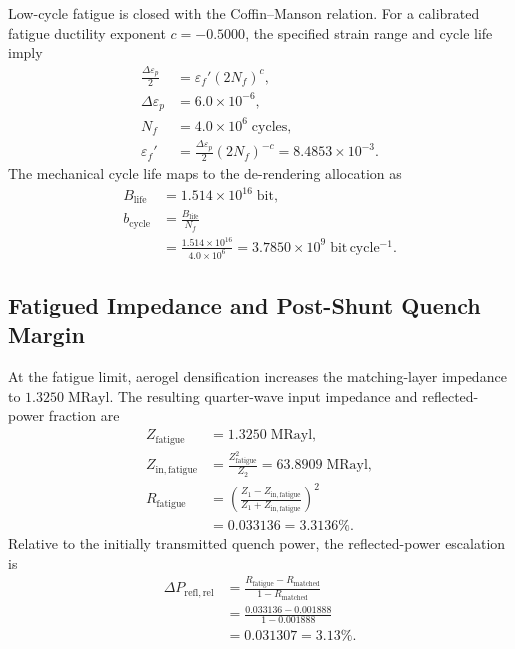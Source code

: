 \documentclass[10pt,twocolumn]{IEEEtran}
\begin{document}
Low-cycle fatigue is closed with the Coffin--Manson relation. For a calibrated fatigue ductility exponent $c=-0.5000$, the specified strain range and cycle life imply
\begin{equation}
\begin{aligned}
\frac{\Delta\varepsilon_p}{2}
&=\varepsilon_f'\left(2N_f\right)^c, \\
\Delta\varepsilon_p&=6.0\times10^{-6}, \\
N_f&=4.0\times10^6\;\mathrm{cycles}, \\
\varepsilon_f'
&=\frac{\Delta\varepsilon_p}{2}
\left(2N_f\right)^{-c}
=8.4853\times10^{-3}.
\end{aligned}
\label{eq:coffin_manson}
\end{equation}
The mechanical cycle life maps to the de-rendering allocation as
\begin{equation}
\begin{aligned}
B_{\mathrm{life}}&=1.514\times10^{16}\;\mathrm{bit}, \\
b_{\mathrm{cycle}}&=\frac{B_{\mathrm{life}}}{N_f} \\
&=\frac{1.514\times10^{16}}{4.0\times10^6}
=3.7850\times10^9\;\mathrm{bit\,cycle^{-1}}.
\end{aligned}
\label{eq:derendering_budget}
\end{equation}

\subsection{Fatigued Impedance and Post-Shunt Quench Margin}

At the fatigue limit, aerogel densification increases the matching-layer impedance to $1.3250\;\mathrm{MRayl}$. The resulting quarter-wave input impedance and reflected-power fraction are
\begin{equation}
\begin{aligned}
Z_{\mathrm{fatigue}}&=1.3250\;\mathrm{MRayl}, \\
Z_{\mathrm{in,fatigue}}
&=\frac{Z_{\mathrm{fatigue}}^2}{Z_2}
=63.8909\;\mathrm{MRayl}, \\
R_{\mathrm{fatigue}}
&=\left(\frac{Z_1-Z_{\mathrm{in,fatigue}}}
{Z_1+Z_{\mathrm{in,fatigue}}}\right)^2 \\
&=0.033136=3.3136\%.
\end{aligned}
\label{eq:fatigue_reflection}
\end{equation}
Relative to the initially transmitted quench power, the reflected-power escalation is
\begin{equation}
\begin{aligned}
\Delta P_{\mathrm{refl,rel}}
&=\frac{R_{\mathrm{fatigue}}-R_{\mathrm{matched}}}
{1-R_{\mathrm{matched}}} \\
&=\frac{0.033136-0.001888}{1-0.001888} \\
&=0.031307=3.13\%.
\end{aligned}
\label{eq:reflection_escalation}
\end{equation}
\end{document}
